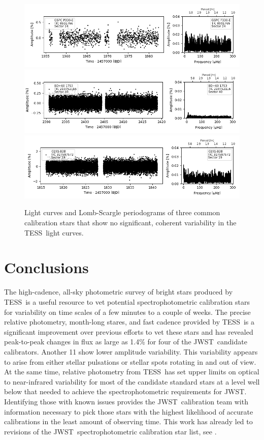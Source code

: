\documentclass[twocolumn, linenumbers]{aastex631}
\newcommand{\webb}{JWST}
\newcommand{\jwst}{JWST}
\newcommand{\tess}{TESS}
\begin{document}
\begin{figure}
    \centering
    \includegraphics[width=0.8\linewidth]{figures/tic00000008591766_s024_flat2.fits.png}
    \includegraphics[width=0.8\linewidth]{tic00000219752116_s040_flat1.fits.png}
    \includegraphics[width=0.8\linewidth]{figures/tic00000327587572_s019_norm1.fits.png}
    \caption{Light curves and Lomb-Scargle periodograms of three common calibration stars that show no significant, coherent variability in the \tess\ light curves.}
    \label{fig:novar}
\end{figure}

\section{Conclusions}
\label{sec:conclusion}

The high-cadence, all-sky photometric survey of bright stars produced by \tess\ is a useful resource to vet potential spectrophotometric calibration stars for variability on time scales of a few minutes to a couple of weeks. The precise relative photometry, month-long stares, and fast cadence provided by \tess\ is a significant improvement over previous efforts to vet these stars and has revealed peak-to-peak changes in flux as large as 1.4\% for four of the \webb\ candidate calibrators. Another 11 show lower amplitude variability. This variability appears to arise from either stellar pulsations or stellar spots rotating in and out of view. At the same time, relative photometry from \tess\ has set upper limits on optical to near-infrared variability for most of the candidate standard stars at a level well below that needed to achieve the spectrophotometric requirements for \jwst.  Identifying those with known issues provides the \webb\ calibration team with information necessary to pick those stars with the highest likelihood of accurate calibrations in the least amount of observing time. This work has already led to revisions of the \webb\ spectrophotometric calibration star list, see \citet{Gordon2022inprep}.
\end{document}
